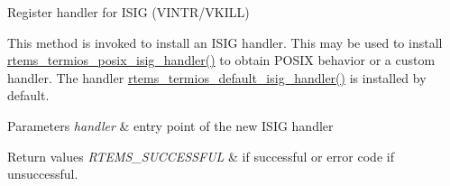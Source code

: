 Register handler for I\+S\+IG (V\+I\+N\+T\+R/\+V\+K\+I\+LL) 

This method is invoked to install an I\+S\+IG handler. This may be used to install \mbox{\hyperlink{group__Termios_gad4bc0c678b0c08941507b4259815e571}{rtems\+\_\+termios\+\_\+posix\+\_\+isig\+\_\+handler()}} to obtain P\+O\+S\+IX behavior or a custom handler. The handler \mbox{\hyperlink{group__Termios_ga31143aa30ff2944008dfe4e77fb2bbf6}{rtems\+\_\+termios\+\_\+default\+\_\+isig\+\_\+handler()}} is installed by default.


\begin{DoxyParams}{Parameters}
{\em handler} & entry point of the new I\+S\+IG handler\\
\hline
\end{DoxyParams}

\begin{DoxyRetVals}{Return values}
{\em R\+T\+E\+M\+S\+\_\+\+S\+U\+C\+C\+E\+S\+S\+F\+UL} & if successful or error code if unsuccessful. \\
\hline
\end{DoxyRetVals}
